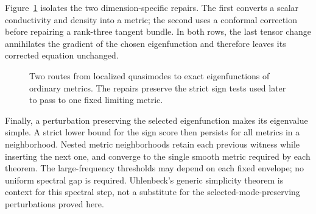 Figure~\ref{fig:two-repairs} isolates the two dimension-specific repairs.
The first converts a scalar conductivity and density into a metric; the
second uses a conformal correction before repairing a rank-three tangent
bundle. In both rows, the last tensor change annihilates the gradient of
the chosen eigenfunction and therefore leaves its corrected equation
unchanged.
\begin{figure}[htbp]
\centering
{}
\caption{Two routes from localized quasimodes to exact eigenfunctions of
ordinary metrics. The repairs preserve the strict sign tests used later
to pass to one fixed limiting metric.}
\label{fig:two-repairs}
\end{figure}

Finally, a perturbation preserving the selected eigenfunction makes its
eigenvalue simple. A strict lower bound for the sign score then persists for all metrics
in a neighborhood. Nested metric neighborhoods retain each previous
witness while inserting the next one, and converge to the single smooth
metric required by each theorem. The large-frequency thresholds may
depend on each fixed envelope; no uniform spectral gap is required.
Uhlenbeck's generic simplicity theorem \cite{Uhlenbeck1976} is context
for this spectral step, not a substitute for the selected-mode-preserving
perturbations proved here.

